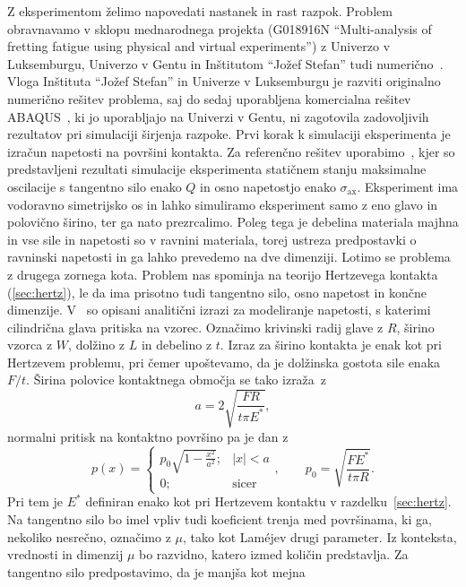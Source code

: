 \documentclass[12pt,a4paper,twoside]{article}
\theoremstyle{definition} %
\theoremstyle{plain} %
\numberwithin{equation}{section}
\newcommand{\sax}{\ensuremath{\sigma_{\text{ax}}}}
\begin{document}
Z eksperimentom želimo napovedati nastanek in rast razpok. Problem obravnavamo  v sklopu
mednarodnega projekta (G018916N ``Multi-analysis of fretting fatigue using physical and virtual
experiments'')  z Univerzo v Luksemburgu, Univerzo v Gentu in Inštitutom ``Jožef Stefan''  tudi
numerično~\cite{pereira2016convergence}. Vloga Inštituta ``Jožef Stefan'' in Univerze v Luksemburgu
je razviti originalno numerično rešitev problema, saj do sedaj uporabljena komercialna rešitev
ABAQUS\textregistered~\cite{hibbitt2001abaqus}, ki jo uporabljajo na Univerzi v Gentu, ni zagotovila
zadovoljivih rezultatov pri simulaciji širjenja razpoke. Prvi korak k simulaciji eksperimenta je
izračun napetosti na površini kontakta. Za referenčno rešitev
uporabimo~\cite{pereira2016convergence}, kjer so predstavljeni rezultati simulacije eksperimenta
statičnem stanju maksimalne oscilacije s tangentno silo enako $Q$ in osno napetostjo enako $\sax$.
Eksperiment ima vodoravno simetrijsko os in lahko simuliramo eksperiment samo z eno glavo in
polovično širino, ter ga nato prezrcalimo. Poleg tega je debelina materiala majhna in vse sile in
napetosti so v ravnini materiala, torej ustreza predpostavki o ravninski napetosti in ga lahko
prevedemo na dve dimenziji. Lotimo se problema z drugega zornega kota. Problem nas spominja na
teorijo Hertzevega kontakta (\ref{sec:hertz}), le da ima prisotno tudi tangentno silo, osno napetost
in končne dimenzije.  V~\cite[razdelek 2]{pereira2016convergence} so opisani analitični izrazi za
modeliranje napetosti, s katerimi cilindrična glava pritiska na vzorec. Označimo krivinski radij
glave z $R$, širino vzorca z $W$, dolžino z $L$ in debelino z $t$. Izraz za širino kontakta je enak
kot pri Hertzevem problemu, pri čemer upoštevamo, da je dolžinska gostota sile enaka $F/t$.  Širina
polovice kontaktnega območja se tako izraža~z
\[
  a = 2\sqrt{\frac{FR}{t \pi E^\ast}},
\]
normalni pritisk na kontaktno površino pa je dan z
\[
  p(x) = \begin{cases}
    p_0 \sqrt{1-\frac{x^2}{a^2}}; & |x| < a \\
    0; & \text{sicer}
  \end{cases}, \qquad p_0 = \sqrt{\frac{FE^\ast}{t \pi R}}.
\]
Pri tem je $E^\ast$ definiran enako kot pri Hertzevem kontaktu v razdelku~\ref{sec:hertz}.
Na tangentno silo bo imel vpliv tudi koeficient trenja med površinama, ki ga, nekoliko nesrečno,
označimo z $\mu$, tako kot Lam\'ejev drugi parameter. Iz konteksta, vrednosti in dimenzij $\mu$ bo
razvidno, katero izmed količin predstavlja. Za tangentno silo predpostavimo, da je manjša kot mejna
\end{document}
